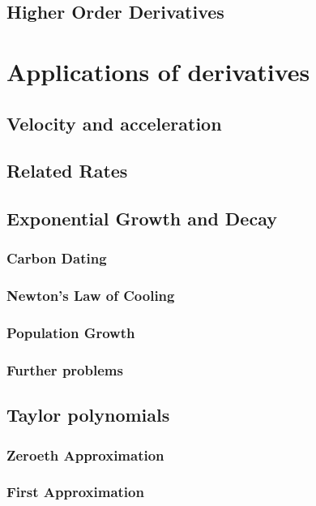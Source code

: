 \documentclass[12pt,letterpaper]{book}
\begin{document}
\section{Higher Order Derivatives}



\chapter{Applications of derivatives}
\section{Velocity and acceleration}

\section{Related Rates}

\section{Exponential Growth and Decay}
\subsection{Carbon Dating}

\subsection{Newton's Law of Cooling}

\subsection{Population Growth}

\subsection{Further problems}

\section{Taylor polynomials}
\subsection{Zeroeth Approximation}

\subsection{First Approximation}

\end{document}

